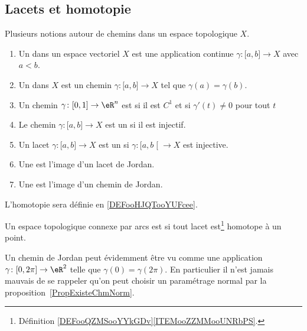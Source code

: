 \subsection{Lacets et homotopie}

\begin{definition}       \label{DEFooQZMSooYYkGDv}
	Plusieurs notions autour de chemins dans un espace topologique \( X\).
	\begin{enumerate}
		\item
		      Un  dans un espace vectoriel \( X\) est une application continue \( \gamma\colon \mathopen[ a , b \mathclose]\to X\) avec \( a<b\).
		\item		\label{ITEMooZZMMooUNRbPS}
		      Un  dans \( X\) est un chemin \( \gamma\colon \mathopen[ a , b \mathclose]\to X\) tel que \( \gamma(a)=\gamma(b)\).
		\item
		      Un chemin \( \gamma\colon \mathopen[ 0 , 1 \mathclose]\to \eR^n\) est  si il est \( C^1\) et si \( \gamma'(t)\neq 0\) pour tout \( t\)
		\item
		      Le chemin \( \gamma\colon \mathopen[ a , b \mathclose]\to X\) est un  si il est injectif.
		\item
		      Un lacet \( \gamma\colon \mathopen[ a , b \mathclose]\to X\) est un  si \( \gamma\colon \mathopen[ a , b \mathclose[\to X\) est injective.
		\item
		      Une  est l'image d'un lacet de Jordan.
		\item
		      Une  est l'image d'un chemin de Jordan.
	\end{enumerate}
	L'homotopie sera définie en \ref{DEFooHJQTooYUFcee}.
\end{definition}

\begin{definition}	\label{DEFooZQSYooJRhFsy}
	Un espace topologique connexe par arcs est  si tout lacet est\footnote{Définition \ref{DEFooQZMSooYYkGDv}\ref{ITEMooZZMMooUNRbPS}.} homotope à un point.
\end{definition}


\begin{normaltext}
	Un chemin de Jordan peut évidemment être vu comme une application \( \gamma\colon \mathopen[ 0 , 2\pi ]\to \eR^2\) telle que \( \gamma(0)=\gamma(2\pi)\). En particulier il n'est jamais mauvais de se rappeler qu'on peut choisir un paramétrage normal par la proposition~\ref{PropExisteChmNorm}.
\end{normaltext}

